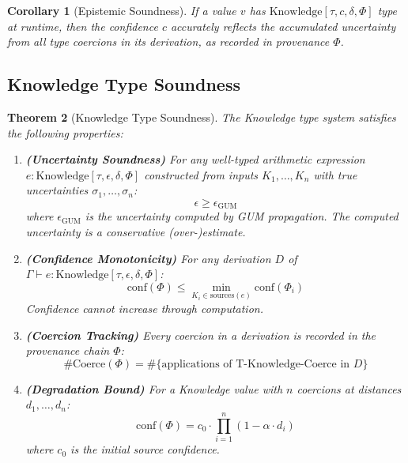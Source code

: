 \documentclass{article}
\newtheorem{theorem}{Theorem}[section]
\newtheorem{corollary}[theorem]{Corollary}
\begin{document}
\begin{corollary}[Epistemic Soundness]
If a value $v$ has $\text{Knowledge}[\tau, c, \delta, \Phi]$ type at runtime,
then the confidence $c$ accurately reflects the accumulated uncertainty from
all type coercions in its derivation, as recorded in provenance $\Phi$.
\end{corollary}

\subsection{Knowledge Type Soundness}

\begin{theorem}[Knowledge Type Soundness]
\label{thm:knowledge-soundness}
The Knowledge type system satisfies the following properties:

\begin{enumerate}
\item \textbf{(Uncertainty Soundness)} For any well-typed arithmetic expression
$e : \text{Knowledge}[\tau, \epsilon, \delta, \Phi]$ constructed from inputs
$K_1, \ldots, K_n$ with true uncertainties $\sigma_1, \ldots, \sigma_n$:
\[
\epsilon \geq \epsilon_{\text{GUM}}
\]
where $\epsilon_{\text{GUM}}$ is the uncertainty computed by GUM propagation.
The computed uncertainty is a conservative (over-)estimate.

\item \textbf{(Confidence Monotonicity)} For any derivation $D$ of
$\Gamma \vdash e : \text{Knowledge}[\tau, \epsilon, \delta, \Phi]$:
\[
\text{conf}(\Phi) \leq \min_{K_i \in \text{sources}(e)} \text{conf}(\Phi_i)
\]
Confidence cannot increase through computation.

\item \textbf{(Coercion Tracking)} Every coercion in a derivation is recorded
in the provenance chain $\Phi$:
\[
\#\text{Coerce}(\Phi) = \#\{\text{applications of T-Knowledge-Coerce in } D\}
\]

\item \textbf{(Degradation Bound)} For a Knowledge value with $n$ coercions
at distances $d_1, \ldots, d_n$:
\[
\text{conf}(\Phi) = c_0 \cdot \prod_{i=1}^{n} (1 - \alpha \cdot d_i)
\]
where $c_0$ is the initial source confidence.
\end{enumerate}
\end{theorem}
\end{document}
